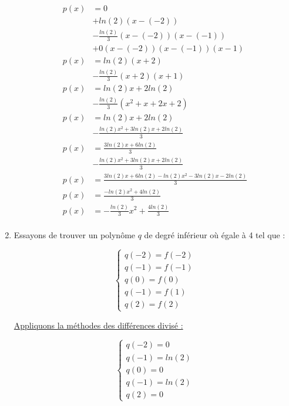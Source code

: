 \documentclass[12pt, letterpaper]{article}
\begin{document}
\begin{enumerate}
  \begin{equation*}
    \begin{split}
      p(x) & = 0 \\
      & + ln(2) (x - (-2)) \\
      & - \frac{ln(2)}{3} (x - (-2)) (x - (-1)) \\
      & + 0 (x - (-2)) (x - (-1)) (x - 1) \\
      p(x) & = ln(2) (x + 2) \\
      & - \frac{ln(2)}{3} (x + 2) (x + 1) \\
      p(x) & = ln(2)x + 2ln(2) \\
      & - \frac{ln(2)}{3} (x^2 + x + 2x + 2)\\
      p(x) & = ln(2)x + 2ln(2) \\
      & - \frac{ln(2)x^2 + 3ln(2)x + 2ln(2)}{3}\\
      p(x) & = \frac{3ln(2)x + 6ln(2)}{3} \\
      & - \frac{ln(2)x^2 + 3ln(2)x + 2ln(2)}{3}\\
      p(x) & = \frac{3ln(2)x + 6ln(2) - ln(2)x^2 - 3ln(2)x -
        2ln(2)}{3}\\
      p(x) & = \frac{- ln(2)x^2 + 4ln(2)}{3}\\
      p(x) & = - \frac{ln(2)}{3}x^2 + \frac{4ln(2)}{3}\\
    \end{split}
  \end{equation*}

\item Essayons de trouver un polynôme $q$ de degré inférieur où égale
  à 4 tel que :

  \begin{equation*}
    \left\{
    \begin{array}{l}
      q(-2) = f(-2) \\
      q(-1) = f(-1) \\
      q(0) = f(0) \\
      q(-1) = f(1) \\
      q(2) = f(2) 
    \end{array}
    \right.
  \end{equation*}

  \underline{Appliquons la méthodes des différences divisé :}

  \begin{equation*}
    \left\{
    \begin{array}{l}
      q(-2) = 0 \\
      q(-1) = ln(2) \\
      q(0) = 0 \\
      q(-1) = ln(2) \\
      q(2) = 0 
    \end{array}
    \right.
  \end{equation*}


\end{enumerate}
\end{document}
